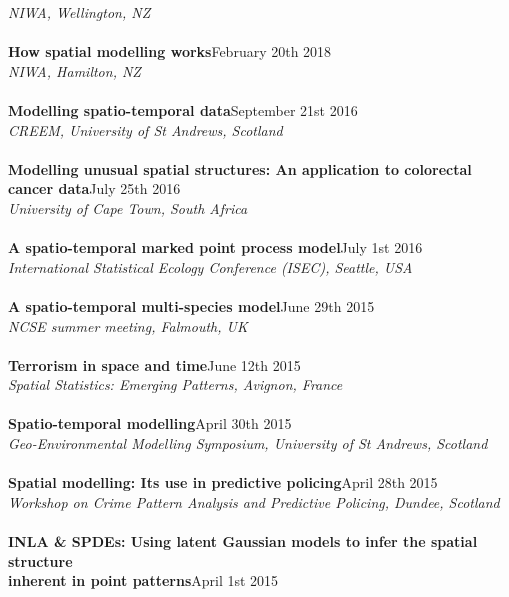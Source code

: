 \documentclass[10pt,letter]{article}
\begin{document}
 {\sl NIWA, Wellington, NZ}\\
 \hdashrule[0.5ex]{4cm}{1pt}{1pt}\\
{\textbf{How spatial modelling works}}\hfill February 20th 2018\\
 {\sl NIWA, Hamilton, NZ}\\
\hdashrule[0.5ex]{4cm}{1pt}{1pt}\\
{\textbf{Modelling spatio-temporal data}}\hfill September 21st 2016\\
 {\sl CREEM, University of St Andrews, Scotland}\\
 \hdashrule[0.5ex]{4cm}{1pt}{1pt}\\
 \noindent
{\textbf{Modelling unusual spatial structures: An application to colorectal cancer data}}\hfill July 25th 2016\\
 {\sl University of Cape Town, South Africa}\\
\hdashrule[0.5ex]{4cm}{1pt}{1pt}\\
{\textbf{A spatio-temporal marked point process model}}\hfill July 1st 2016\\
 {\sl International Statistical Ecology Conference (ISEC), Seattle, USA}\\
  \hdashrule[0.5ex]{4cm}{1pt}{1pt}\\
 {\textbf{A spatio-temporal multi-species model}}\hfill June 29th 2015\\
 {\sl NCSE summer meeting, Falmouth, UK}\\
 \hdashrule[0.5ex]{4cm}{1pt}{1pt}\\
{\textbf{Terrorism in space and time}}\hfill June 12th 2015\\
 {\sl Spatial Statistics: Emerging Patterns, Avignon, France}\\
 \hdashrule[0.5ex]{4cm}{1pt}{1pt}\\
 {\textbf{Spatio-temporal modelling}}\hfill April 30th 2015\\
 {\sl Geo-Environmental Modelling Symposium, University of St Andrews, Scotland}\\
 \hdashrule[0.5ex]{4cm}{1pt}{1pt}\\
 \noindent
{\textbf{Spatial modelling: Its use in predictive policing}}\hfill April 28th 2015\\
{\sl Workshop on Crime Pattern Analysis and Predictive Policing, Dundee, Scotland}\\
\hdashrule[0.5ex]{4cm}{1pt}{1pt}\\
{\textbf{INLA \& SPDEs: Using latent Gaussian models to infer the spatial structure \\
inherent in point patterns}}\hfill April 1st 2015\\
\end{document}
